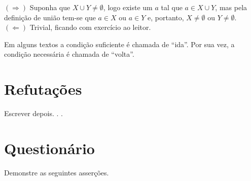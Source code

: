 \begin{prova}
		$(\Rightarrow)$ Suponha que $X \cup Y \neq \emptyset$, logo existe um $a$ tal que $a \in X \cup Y$, mas pela definição de união tem-se que $a \in X$ ou $a \in Y$ e, portanto, $X \neq \emptyset$ ou $Y \neq \emptyset$. $(\Leftarrow)$ Trivial, ficando com exercício ao leitor.
\end{prova}

\begin{atencao}
	Em alguns textos \cite{fmcbook, benjaLivro2010} a condição suficiente é chamada de ``ida''. Por sua vez, a condição necessária é chamada de ``volta''.
\end{atencao}

\section{Refutações}

{\color{red}Escrever depois. . .}

\section{Questionário}\label{sec:Questionario2part1}

\begin{questao}\label{test:Demosntracoes1}
	Demonstre as seguintes asserções.
\end{questao}

